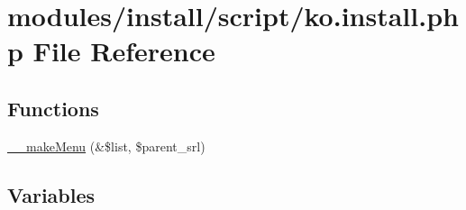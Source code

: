 \hypertarget{ko_8install_8php}{\section{modules/install/script/ko.install.\-php File Reference}
\label{ko_8install_8php}
}
\subsection*{Functions}
\begin{DoxyCompactItemize}
\item 
\hyperlink{ko_8install_8php_ad60c2cd76a2ed990ddee173225120808}{\-\_\-\-\_\-make\-Menu} (\&\$list, \$parent\-\_\-srl)
\end{DoxyCompactItemize}
\subsection*{Variables}
